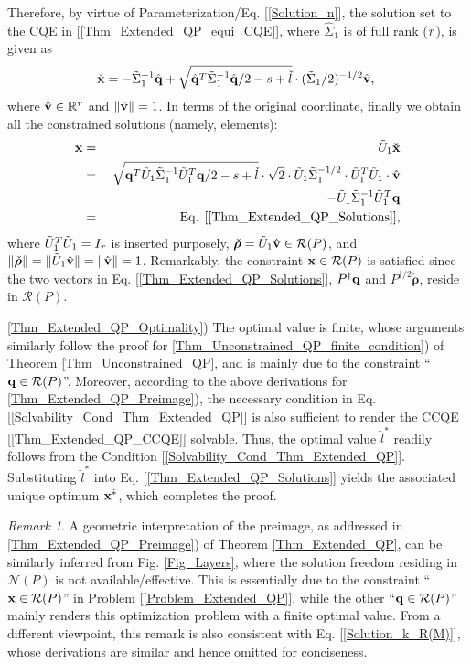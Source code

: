 \documentclass[9pt,twocolumn,twoside,lineno]{pnas-new-1}
\newcommand{\beq}{\begin{eqnarray}}
\newcommand{\eeq}{\end{eqnarray}}
\newcommand{\bfx}{{\bf x}}
\newcommand{\bfq}{{\bf q}}
\newcommand{\bfv}{{\bf v}}
\newcommand{\bfrho}{{\boldsymbol \rho}}
\newcommand{\real}{\mathbb{R}}
\newcommand{\calN}{{\mathcal N}}
\newcommand{\calR}{{\mathcal R}}
\newcommand{\itr}{{\it r}}
\theoremstyle{remark}
\newtheorem{remark}{Remark}[section]
\begin{document}
Therefore, by virtue of Parameterization/Eq. [\ref{Solution_n}], the solution set to the CQE in [\ref{Thm_Extended_QP_equi_CQE}], where $\hat\Sigma_1$ is of full rank ($\itr$), is given as
\beq
\check\bfx=-\tilde\Sigma_1^{-1}\hat\bfq+\sqrt{{\hat\bfq^T\tilde\Sigma_1^{-1}\hat\bfq/2}-s+\check l}\cdot ({\tilde\Sigma_1/2})^{-{1/2}}\hat\bfv,~
\eeq
where $\hat\bfv\in\real^\itr$ and $\Vert\hat\bfv\Vert=1$. In terms of the original coordinate, finally we obtain all the constrained solutions (namely, elements):
\beq
\bfx&{}={}&\tilde U_1\check\bfx\nonumber\\
&{}={}&\sqrt{\bfq^T\tilde U_1\tilde\Sigma_1^{-1}\tilde U_1^T\bfq/2-s+\check l}\cdot\sqrt{2}\cdot\tilde U_1\tilde\Sigma_1^{-1/2}\cdot\tilde U_1^T\tilde U_1\cdot \hat\bfv\nonumber\\&&-\tilde U_1\tilde\Sigma_1^{-1}\tilde U_1^T\bfq\nonumber\\
&{}={}&\mbox{Eq. [\ref{Thm_Extended_QP_Solutions}]},\nonumber
\eeq
where $\tilde U_1^T\tilde U_1=I_\itr$ is inserted purposely, $\check\bfrho=\tilde U_1\hat\bfv\in \calR(P)$, and $\Vert\check\bfrho\Vert=\Vert\tilde U_1\hat\bfv\Vert=\Vert\hat\bfv\Vert=1$. Remarkably, the constraint $\bfx\in \calR(P)$ is satisfied since the two vectors in Eq. [\ref{Thm_Extended_QP_Solutions}], $P^\dagger\bfq$ and $P^{\dagger/2}\check\bfrho$, reside in $\calR(P)$.\vspace{0.16cm}

\noindent\ref{Thm_Extended_QP_Optimality}) The optimal value is finite, whose arguments similarly follow the proof for \ref{Thm_Unconstrained_QP_finite_condition}) of Theorem \ref{Thm_Unconstrained_QP}, and is mainly due to the constraint ``$\bfq\in\calR(P)$''. Moreover, according to the above derivations for \ref{Thm_Extended_QP_Preimage}), the necessary condition in Eq. [\ref{Solvability_Cond_Thm_Extended_QP}] is also sufficient to render the CCQE [\ref{Thm_Extended_QP_CCQE}] solvable. Thus, the optimal value $\check l^*$ readily follows from the Condition [\ref{Solvability_Cond_Thm_Extended_QP}]. Substituting $\check l^*$ into Eq. [\ref{Thm_Extended_QP_Solutions}] yields the associated unique optimum $\bfx^{\hat *}$, which completes the proof.

\begin{remark}
A geometric interpretation of the preimage, as addressed in \ref{Thm_Extended_QP_Preimage}) of Theorem \ref{Thm_Extended_QP}, can be similarly inferred from Fig. \ref{Fig_Layers}, where the solution freedom residing in $\calN(P)$ is not available/effective. This is essentially due to the constraint ``$\bfx\in\calR(P)$'' in Problem [\ref{Problem_Extended_QP}], while the other ``$\bfq\in\calR(P)$'' mainly renders this optimization problem with a finite optimal value. From a different viewpoint, this remark is also consistent with Eq. [\ref{Solution_k_R(M)}], whose derivations are similar and hence omitted for conciseness.
\end{remark}
\end{document}
